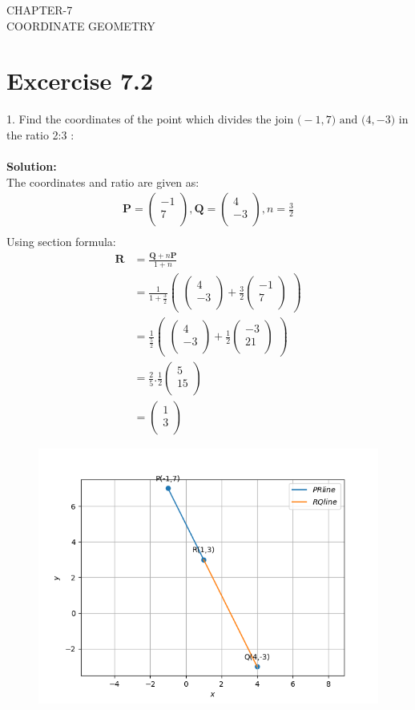 \documentclass[12pt]{article}
\newcommand{\solution}{\noindent \textbf{Solution: }}
\newcommand{\myvec}[1]{\ensuremath{\begin{pmatrix}#1\end{pmatrix}}}
\let\vec\mathbf
\begin{document}
\begin{center}
\textbf\large{CHAPTER-7 \\ COORDINATE GEOMETRY}
\end{center}
\section*{Excercise 7.2}

1. Find the coordinates of the point which divides the join $\vec(-1,7) \text{ and } \vec(4,-3)$ in the ratio 2:3 :
\\
\\
\solution\\		
The coordinates and ratio are given as:
\begin{align}
\vec{P}=\myvec{-1\\7\\},
\vec{Q}=\myvec{4\\-3\\},
n=\frac{3}{2}\\
\end{align}
Using section formula:
\begin{align}
\vec{R}&=\frac{\vec{Q}+n\vec{P}}{1+n}\\
&=\frac{1}{1+\frac{3}{2}}  \myvec{\myvec{
4\\
-3\\
}
  +
   \frac{3}{2}\myvec{
-1\\
7\\
}}\\
&= \frac{1}{\frac{5}{2}} \myvec{\myvec{
4\\
-3\\
}
  +
\frac{1}{2}\myvec{
-3\\
21\\
}} \\
&=\frac{2}{5}.\frac{1}{2}
\myvec{
5\\
15\\
}\\
&=\myvec{
1\\
3\\
}
\end{align}


\begin{figure}[!h]
\begin{center}
   \includegraphics[width=\columnwidth]{./figs/linefig.png}
\end{center}
\caption{}
\label{fig:Fig}
\end{figure}
\end{document}
